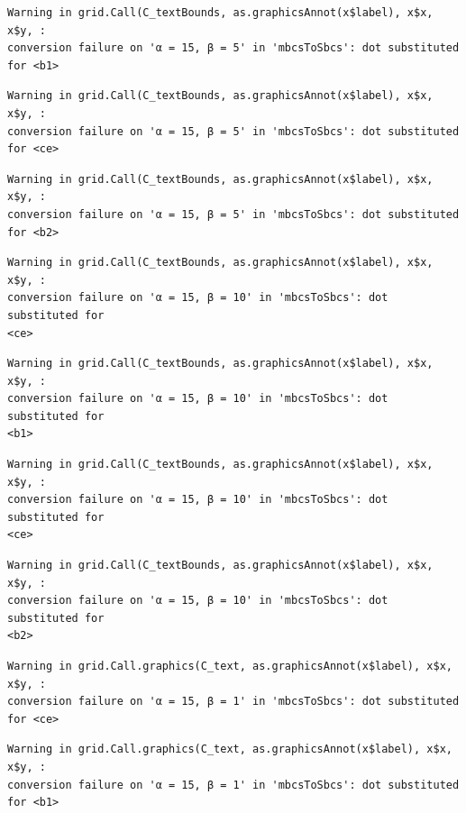 \documentclass[
  spanish,
  a4paper,
]{scrreport}
\theoremstyle{plain}
\theoremstyle{definition}
\theoremstyle{definition}
\theoremstyle{remark}
\begin{document}
\begin{verbatim}
Warning in grid.Call(C_textBounds, as.graphicsAnnot(x$label), x$x, x$y, :
conversion failure on 'α = 15, β = 5' in 'mbcsToSbcs': dot substituted for <b1>
\end{verbatim}

\begin{verbatim}
Warning in grid.Call(C_textBounds, as.graphicsAnnot(x$label), x$x, x$y, :
conversion failure on 'α = 15, β = 5' in 'mbcsToSbcs': dot substituted for <ce>
\end{verbatim}

\begin{verbatim}
Warning in grid.Call(C_textBounds, as.graphicsAnnot(x$label), x$x, x$y, :
conversion failure on 'α = 15, β = 5' in 'mbcsToSbcs': dot substituted for <b2>
\end{verbatim}

\begin{verbatim}
Warning in grid.Call(C_textBounds, as.graphicsAnnot(x$label), x$x, x$y, :
conversion failure on 'α = 15, β = 10' in 'mbcsToSbcs': dot substituted for
<ce>
\end{verbatim}

\begin{verbatim}
Warning in grid.Call(C_textBounds, as.graphicsAnnot(x$label), x$x, x$y, :
conversion failure on 'α = 15, β = 10' in 'mbcsToSbcs': dot substituted for
<b1>
\end{verbatim}

\begin{verbatim}
Warning in grid.Call(C_textBounds, as.graphicsAnnot(x$label), x$x, x$y, :
conversion failure on 'α = 15, β = 10' in 'mbcsToSbcs': dot substituted for
<ce>
\end{verbatim}

\begin{verbatim}
Warning in grid.Call(C_textBounds, as.graphicsAnnot(x$label), x$x, x$y, :
conversion failure on 'α = 15, β = 10' in 'mbcsToSbcs': dot substituted for
<b2>
\end{verbatim}

\begin{verbatim}
Warning in grid.Call.graphics(C_text, as.graphicsAnnot(x$label), x$x, x$y, :
conversion failure on 'α = 15, β = 1' in 'mbcsToSbcs': dot substituted for <ce>
\end{verbatim}

\begin{verbatim}
Warning in grid.Call.graphics(C_text, as.graphicsAnnot(x$label), x$x, x$y, :
conversion failure on 'α = 15, β = 1' in 'mbcsToSbcs': dot substituted for <b1>
\end{verbatim}
\end{document}
